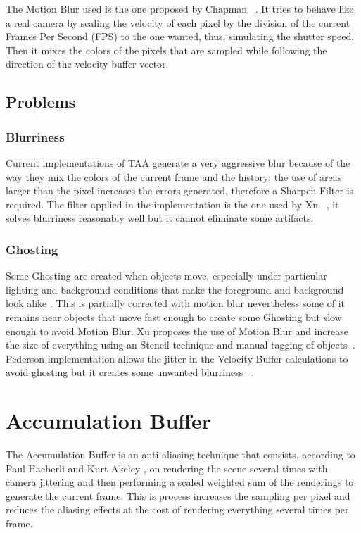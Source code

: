 \documentclass{cslthse-msc}
\begin{document}
The Motion Blur used is the one proposed by Chapman ~\cite{Chapman2012}. It tries to behave like a real camera by scaling the velocity of each pixel by the division of the current Frames Per Second (FPS) to the one wanted, thus, simulating the shutter speed. Then it mixes the colors of the pixels that are sampled while following the direction of the velocity buffer vector.

\subsection{Problems}
\subsubsection{Blurriness} 
Current implementations of TAA generate a very aggressive blur because of the way they mix the colors of the current frame and the history; the use of areas larger than the pixel increases the errors generated, therefore a Sharpen Filter is required. The filter applied in the implementation is the one used by Xu ~\cite{XU2016}, it solves blurriness reasonably well but it cannot eliminate some artifacts. 

\subsubsection{Ghosting} 
Some Ghosting are created when objects move, especially under particular lighting and background conditions that make the foreground and background look alike . This is partially corrected with motion blur nevertheless some of it remains near objects that move fast enough to create some Ghosting but slow enough to avoid Motion Blur. Xu proposes the use of Motion Blur and increase the size of everything using an Stencil technique and manual tagging of objects~\cite{XU2016}. Pederson implementation allows the jitter in the Velocity Buffer calculations to avoid ghosting but it creates some unwanted blurriness ~\cite{Fuglsand2016}. 

\section{Accumulation Buffer}
The Accumulation Buffer is an anti-aliasing technique that consists, according to Paul Haeberli and Kurt Akeley \cite{Haeberli1990}, on rendering the scene several times with camera jittering and then performing a scaled weighted sum of the renderings to generate the current frame.
This is process increases the sampling per pixel and reduces the aliasing effects at the cost of rendering everything several times per frame.
\end{document}
